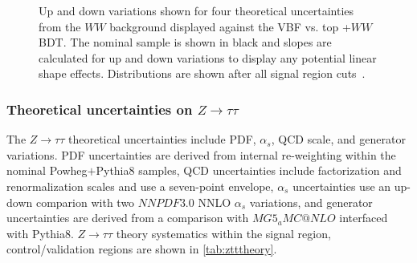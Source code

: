 \begin{figure}[!h]
  \hfill
  \hfill
{\caption{Up and down variations shown for four theoretical uncertainties from the $WW$ background displayed against the VBF vs. top +$WW$ BDT. The nominal sample is shown in black and slopes are calculated for up and down variations to display any potential linear shape effects. Distributions are shown after all signal region cuts~\cite{ourSupportNote}.
\label{fig:wwtheor}}}
\end{figure}

\subsubsection{Theoretical uncertainties on $Z\rightarrow\tau\tau$}

The $Z\rightarrow\tau\tau$ theoretical uncertainties include PDF, $\alpha_s$, QCD scale, and generator variations. PDF uncertainties are derived from internal re-weighting within the nominal Powheg$+$Pythia8 samples, QCD uncertainties include factorization and renormalization scales and use a seven-point envelope, $\alpha_s$ uncertainties use an up-down comparion with two $NNPDF3.0$ NNLO $\alpha_s$ variations, and generator uncertainties are derived from a comparison with $MG5_aMC@NLO$ interfaced with Pythia8. $Z\rightarrow\tau\tau$ theory systematics within the signal region, control/validation regions are shown in \ref{tab:ztttheory}.

